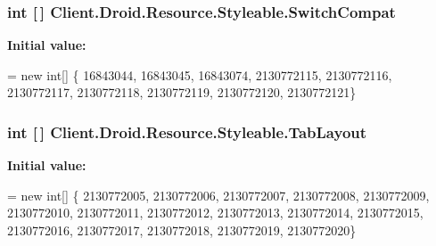 \subsubsection[{Switch\+Compat}]{\setlength{\rightskip}{0pt plus 5cm}int \mbox{[}$\,$\mbox{]} Client.\+Droid.\+Resource.\+Styleable.\+Switch\+Compat\hspace{0.3cm}{\ttfamily [static]}}\label{classClient_1_1Droid_1_1Resource_1_1Styleable_a85856c936494dfcaf611d99a3fea82c4}
{\bfseries Initial value\+:}
\begin{DoxyCode}
= \textcolor{keyword}{new} \textcolor{keywordtype}{int}[]
            \{
                    16843044,
                    16843045,
                    16843074,
                    2130772115,
                    2130772116,
                    2130772117,
                    2130772118,
                    2130772119,
                    2130772120,
                    2130772121\}
\end{DoxyCode}
\hypertarget{classClient_1_1Droid_1_1Resource_1_1Styleable_a5973859b4d35a1e6698fd40ecbd98eba}{}
\subsubsection[{Tab\+Layout}]{\setlength{\rightskip}{0pt plus 5cm}int \mbox{[}$\,$\mbox{]} Client.\+Droid.\+Resource.\+Styleable.\+Tab\+Layout\hspace{0.3cm}{\ttfamily [static]}}\label{classClient_1_1Droid_1_1Resource_1_1Styleable_a5973859b4d35a1e6698fd40ecbd98eba}
{\bfseries Initial value\+:}
\begin{DoxyCode}
= \textcolor{keyword}{new} \textcolor{keywordtype}{int}[]
            \{
                    2130772005,
                    2130772006,
                    2130772007,
                    2130772008,
                    2130772009,
                    2130772010,
                    2130772011,
                    2130772012,
                    2130772013,
                    2130772014,
                    2130772015,
                    2130772016,
                    2130772017,
                    2130772018,
                    2130772019,
                    2130772020\}
\end{DoxyCode}
\hypertarget{classClient_1_1Droid_1_1Resource_1_1Styleable_a6204cea58e4754ba66771975d6f4209a}{}
